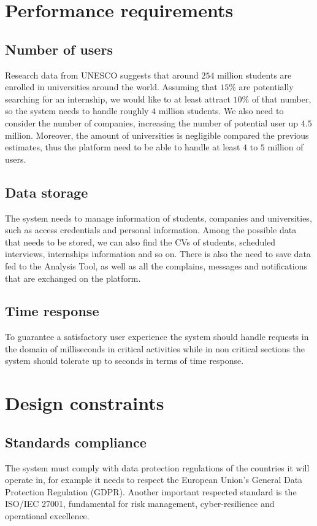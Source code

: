 \section{Performance requirements}\label{sec:performance-requirements}
\subsection{Number of users}\label{subsec:number-of-users}
Research data from UNESCO suggests that around $254$ million students are enrolled in universities around the world.
Assuming that $15\%$ are potentially searching for an internship, we would like to at least attract $10\%$ of that number, so the system needs to handle roughly $4$ million students.
We also need to consider the number of companies, increasing the number of potential user up $4.5$ million.
Moreover, the amount of universities is negligible compared the previous estimates, thus the platform need to be able to handle at least $4$ to $5$ million of users.
\subsection{Data storage}\label{subsec:data-storage}
The system needs to manage information of students, companies and universities, such as access credentials and personal information.
Among the possible data that needs to be stored, we can also find the CVs of students, scheduled interviews, internships information and so on.
There is also the need to save data fed to the Analysis Tool, as well as all the complains, messages and notifications that are exchanged on the platform.
\subsection{Time response}\label{subsec:time-response}
To guarantee a satisfactory user experience the system should handle requests in the domain of milliseconds in critical activities while in non critical sections the system should tolerate up to seconds in terms of time response.

\section{Design constraints}\label{sec:design-constraints}
\subsection{Standards compliance}\label{subsec:standards-compliance}
The system must comply with data protection regulations of the countries it will operate in, for example it needs to respect the European Union's General Data Protection Regulation (GDPR).
Another important respected standard is the ISO/IEC 27001, fundamental for risk management, cyber-resilience and operational excellence.
